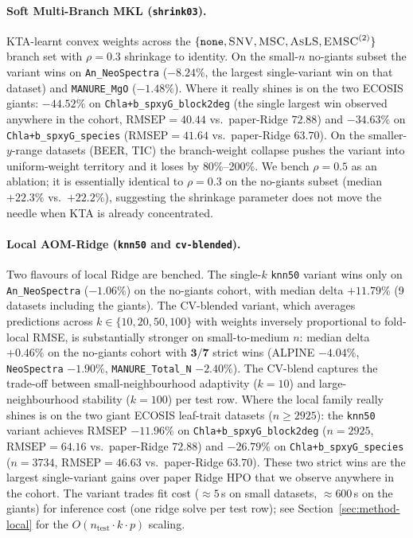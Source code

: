 \documentclass[11pt,a4paper]{article}
\newcommand{\SNV}{\textsc{SNV}\xspace}
\newcommand{\MSC}{\textsc{MSC}\xspace}
\newcommand{\EMSC}{\textsc{EMSC}\xspace}
\newcommand{\AsLS}{\textsc{AsLS}\xspace}
\begin{document}
\paragraph{Soft Multi-Branch MKL (\texttt{shrink03}).}
KTA-learnt convex weights across the
$\{\texttt{none},\SNV,\MSC,\AsLS,\EMSC^{(2)}\}$ branch set with
$\rho=0.3$ shrinkage to identity. On the small-$n$ no-giants subset
the variant wins on \texttt{An\_NeoSpectra} ($-8.24\%$, the
largest single-variant win on that dataset) and \texttt{MANURE\_MgO}
($-1.48\%$). Where it really shines is on the two ECOSIS giants:
$\bm{-44.52\%}$ on \texttt{Chla+b\_spxyG\_block2deg} (the single
largest win observed anywhere in the cohort, $\mathrm{RMSEP}=40.44$
vs.\ paper-Ridge $72.88$) and $\bm{-34.63\%}$ on
\texttt{Chla+b\_spxyG\_species} ($\mathrm{RMSEP}=41.64$ vs.\
paper-Ridge $63.70$). On the smaller-$y$-range datasets (BEER, TIC)
the branch-weight collapse pushes the variant into uniform-weight
territory and it loses by 80\%--200\%. We bench
$\rho=0.5$ as an ablation; it is essentially identical to
$\rho=0.3$ on the no-giants subset (median $+22.3\%$ vs.\ $+22.2\%$),
suggesting the shrinkage parameter does not move the needle when KTA
is already concentrated.

\paragraph{Local AOM-Ridge (\texttt{knn50} and \texttt{cv-blended}).}
Two flavours of local Ridge are benched. The single-$k$
\texttt{knn50} variant wins only on \texttt{An\_NeoSpectra}
($-1.06\%$) on the no-giants cohort, with median delta $+11.79\%$
(9 datasets including the giants). The CV-blended variant, which
averages predictions across $k\in\{10,20,50,100\}$ with weights
inversely proportional to fold-local RMSE, is substantially
stronger on small-to-medium $n$: median delta $\bm{+0.46\%}$ on
the no-giants cohort with $\bm{3/7}$ strict wins (ALPINE $-4.04\%$,
\texttt{NeoSpectra} $-1.90\%$, \texttt{MANURE\_Total\_N}
$-2.40\%$). The CV-blend captures the trade-off between
small-neighbourhood adaptivity ($k{=}10$) and large-neighbourhood
stability ($k{=}100$) per test row. Where the local family really
shines is on the two giant ECOSIS leaf-trait datasets ($n\geq 2925$):
the \texttt{knn50} variant achieves RMSEP $\bm{-11.96\%}$ on
\texttt{Chla+b\_spxyG\_block2deg} ($n=2925$,
$\mathrm{RMSEP}=64.16$ vs.\ paper-Ridge $72.88$) and
$\bm{-26.79\%}$ on \texttt{Chla+b\_spxyG\_species} ($n=3734$,
$\mathrm{RMSEP}=46.63$ vs.\ paper-Ridge $63.70$). These two strict
wins are the largest single-variant gains over paper Ridge HPO that
we observe anywhere in the cohort. The variant trades fit cost
($\approx 5$\,s on small datasets, $\approx 600$\,s on the giants)
for inference cost (one ridge solve per test row); see
Section~\ref{sec:method-local} for the
$O(n_\mathrm{test} \cdot k \cdot p)$ scaling.
\end{document}
